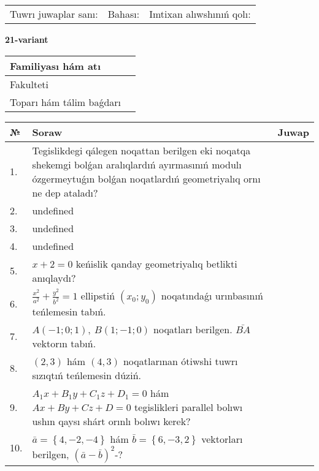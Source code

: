 \documentclass{article}
\begin{document}
\vspace{0.7cm}

\begin{tabular}{lll}
Tuwrı juwaplar sanı: \underline{\hspace{1cm}} & 
Bahası: \underline{\hspace{1cm}} & 
Imtixan alıwshınıń qolı: \underline{\hspace{2cm}} \\
\end{tabular}

\egroup

\newpage


\textbf{21-variant}\\

\bgroup
\def\arraystretch{1.6} %

\begin{tabular}{|m{5.7cm}|m{9.5cm}|}
\hline
Familiyası hám atı & \\
\hline
Fakulteti  & \\
\hline
Toparı hám tálim baǵdarı  & \\
\hline
\end{tabular}

\vspace{0.7cm}

\begin{tabular}{|m{0.7cm}|m{10cm}|m{4cm}|}
\hline
№ & Soraw & Juwap \\
\hline
1. & Tegislikdegi qálegen noqattan berilgen eki noqatqa shekemgi bolǵan aralıqlardıń ayırmasınıń modulı ózgermeytuǵın bolǵan noqatlardıń geometriyalıq ornı ne dep ataladı? &  \\
\hline
2. & undefined &  \\
\hline
3. & undefined &  \\
\hline
4. & undefined &  \\
\hline
5. & \(x + 2 = 0\) keńislik qanday geometriyalıq betlikti anıqlaydı? &  \\
\hline
6. & \(\frac{x^{2}}{a^{2}} + \frac{y^{2}}{b^{2}} = 1\) ellipstiń \((x_{0};y_{0})\) noqatındaǵı urınbasınıń teńlemesin tabıń. &  \\
\hline
7. & \(A (- 1;0;1),\ B (1; - 1;0)\) noqatları berilgen. \(\bar{BA}\) vektorın tabıń. &  \\
\hline
8. & $(2, 3)$ hám $(4, 3)$ noqatlarınan ótiwshi tuwrı sızıqtıń teńlemesin dúziń. &  \\
\hline
9. & \(A_{1}x + B_{1}y + C_{1}z + D_{1} = 0\) hám \(Ax + By + Cz + D = 0\) tegislikleri parallel bolıwı ushın qaysı shárt orınlı bolıwı kerek? &  \\
\hline
10. & \(\bar{a} = \left\{ 4,- 2,- 4 \right\}\) hám \(\bar{b} = \left\{ 6,- 3, 2 \right\}\) vektorları berilgen, \((\bar{a} - \bar{b}) ^{2}\)-? & \\
\hline
\end{tabular}
\end{document}
